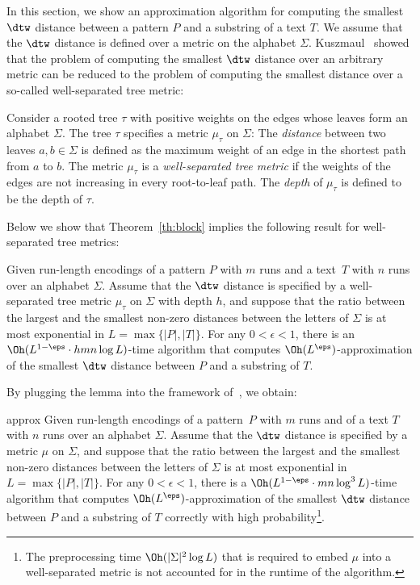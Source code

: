 In this section, we show an approximation algorithm for computing the smallest $\dtw$ distance between a pattern $P$ and a substring of a text $T$. We assume that the $\dtw$ distance is defined over a metric on the alphabet $\Sigma$. Kuszmaul~\cite{DBLP:conf/icalp/Kuszmaul19} showed that the problem of computing the smallest $\dtw$ distance over an arbitrary metric can be reduced to the problem of computing the smallest distance over a so-called well-separated tree metric: 

\begin{definition}
 Consider a rooted tree $\tau$ with positive weights on the edges whose leaves form an alphabet $\Sigma$. The tree $\tau$ specifies a metric $\mu_\tau$ on $\Sigma$: The  \emph{distance} between two leaves $a,b \in \Sigma$ is defined as the maximum weight of an edge in the shortest path from $a$ to $b$. The metric $\mu_\tau$ is a \emph{well-separated tree metric} if the weights of the edges are not increasing in every root-to-leaf path.  The \emph{depth} of $\mu_\tau$ is defined to be the depth of $\tau$.
\end{definition}

Below we show that Theorem~\ref{th:block} implies the following result for well-separated tree metrics:

\begin{lemma}\label{lm:approx}
  Given run-length encodings of a pattern $P$ with $m$ runs and a text~$T$ with $n$ runs over an alphabet $\Sigma$. Assume that the $\dtw$ distance is specified by a well-separated tree metric $\mu_\tau$ on $\Sigma$ with depth $h$, and suppose that the ratio between the largest and the smallest non-zero distances between the letters of $\Sigma$ is at most exponential in $L = \max\{|P|,|T|\}$. For any $0 < \epsilon < 1$, there is an $\Oh (L^{1-\eps} \cdot hmn \log L)$-time algorithm that computes $\Oh(L^{\eps})$-approximation of the smallest $\dtw$ distance between $P$ and a substring of $T$.
\end{lemma}

By plugging the lemma into the framework of~\cite{DBLP:conf/icalp/Kuszmaul19}, we obtain:

\begin{theorem}{approx}
  \label{th:approx}
  Given run-length encodings of a pattern~$P$ with $m$ runs and of a text $T$ with $n$ runs over an alphabet $\Sigma$. Assume that the $\dtw$ distance is specified by a metric $\mu$ on $\Sigma$, and suppose that the ratio between the largest and the smallest non-zero distances between the letters of $\Sigma$ is at most exponential in $L = \max\{|P|,|T|\}$.
  For any $0 < \epsilon < 1$, there is a $\Oh(L^{1-\eps} \cdot mn \log^3 L)$-time algorithm that computes $\Oh(L^{\eps})$-approximation of the smallest $\dtw$ distance between $P$ and a substring of $T$ correctly with high probability\footnote{The preprocessing time $\Oh(|\Sigma|^2 \log L)$ that is required to embed $\mu$ into a well-separated metric is not accounted for in the runtime of the algorithm.}.
\end{theorem}

